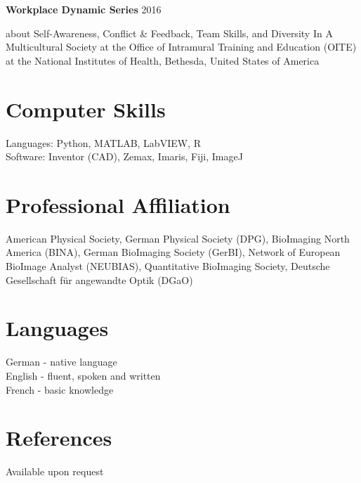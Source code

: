 \documentclass[margin,line]{res}
\begin{document}
\begin{resume}
\vspace*{-3mm}

{\bf Workplace Dynamic Series} \hfill {2016}\\
\vspace*{-3.5mm}
\begin{addmargin}[0pt]{.1\linewidth}
\vspace*{-1mm}
about Self-Awareness, Conflict \& Feedback, Team Skills, and Diversity In A Multicultural Society at the Office of Intramural Training and Education (OITE) at the National Institutes of Health, Bethesda, United States of America
\end{addmargin}


\section{\sc Computer Skills} 

Languages:  Python, MATLAB, LabVIEW, R\\ %
Software: Inventor (CAD), Zemax, Imaris, Fiji, ImageJ


\section{\sc Professional Affiliation} 
American Physical Society, German Physical Society (DPG), BioImaging North America (BINA), German BioImaging Society (GerBI), Network of European BioImage Analyst (NEUBIAS), Quantitative BioImaging Society, Deutsche Gesellschaft für angewandte Optik (DGaO)


\section{\sc Languages} 
German - native language\\English  - fluent, spoken and written  \\French - basic knowledge %


\section{\sc References} 
Available upon request


\end{resume}
\end{document}

